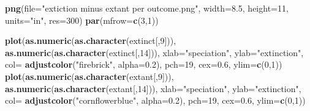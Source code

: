 \documentclass[]{book}
\newenvironment{Shaded}{\begin{snugshade}}{\end{snugshade}}
\newcommand{\KeywordTok}[1]{\textcolor[rgb]{0.13,0.29,0.53}{\textbf{{#1}}}}
\newcommand{\DataTypeTok}[1]{\textcolor[rgb]{0.13,0.29,0.53}{{#1}}}
\newcommand{\DecValTok}[1]{\textcolor[rgb]{0.00,0.00,0.81}{{#1}}}
\newcommand{\FloatTok}[1]{\textcolor[rgb]{0.00,0.00,0.81}{{#1}}}
\newcommand{\StringTok}[1]{\textcolor[rgb]{0.31,0.60,0.02}{{#1}}}
\newcommand{\NormalTok}[1]{{#1}}
\theoremstyle{definition}
\theoremstyle{definition}
\theoremstyle{remark}
\begin{document}
\begin{Shaded}
\begin{Highlighting}[]
\KeywordTok{png}\NormalTok{(}\DataTypeTok{file=}\StringTok{"extiction minus extant per outcome.png"}\NormalTok{, }\DataTypeTok{width=}\FloatTok{8.5}\NormalTok{, }\DataTypeTok{height=}\DecValTok{11}\NormalTok{, }\DataTypeTok{units=}\StringTok{"in"}\NormalTok{, }\DataTypeTok{res=}\DecValTok{300}\NormalTok{)}
\KeywordTok{par}\NormalTok{(}\DataTypeTok{mfrow=}\KeywordTok{c}\NormalTok{(}\DecValTok{3}\NormalTok{,}\DecValTok{1}\NormalTok{))}

\KeywordTok{plot}\NormalTok{(}\KeywordTok{as.numeric}\NormalTok{(}\KeywordTok{as.character}\NormalTok{(extinct[,}\DecValTok{9}\NormalTok{])), }\KeywordTok{as.numeric}\NormalTok{(}\KeywordTok{as.character}\NormalTok{(extinct[,}\DecValTok{14}\NormalTok{])), }\DataTypeTok{xlab=}\StringTok{"speciation"}\NormalTok{, }\DataTypeTok{ylab=}\StringTok{"extinction"}\NormalTok{, }\DataTypeTok{col=} \KeywordTok{adjustcolor}\NormalTok{(}\StringTok{"firebrick"}\NormalTok{, }\DataTypeTok{alpha=}\FloatTok{0.2}\NormalTok{), }\DataTypeTok{pch=}\DecValTok{19}\NormalTok{, }\DataTypeTok{cex=}\FloatTok{0.6}\NormalTok{, }\DataTypeTok{ylim=}\KeywordTok{c}\NormalTok{(}\DecValTok{0}\NormalTok{,}\DecValTok{1}\NormalTok{))}
\KeywordTok{plot}\NormalTok{(}\KeywordTok{as.numeric}\NormalTok{(}\KeywordTok{as.character}\NormalTok{(extant[,}\DecValTok{9}\NormalTok{])), }\KeywordTok{as.numeric}\NormalTok{(}\KeywordTok{as.character}\NormalTok{(extant[,}\DecValTok{14}\NormalTok{])), }\DataTypeTok{xlab=}\StringTok{"speciation"}\NormalTok{, }\DataTypeTok{ylab=}\StringTok{"extinction"}\NormalTok{, }\DataTypeTok{col=} \KeywordTok{adjustcolor}\NormalTok{(}\StringTok{"cornflowerblue"}\NormalTok{, }\DataTypeTok{alpha=}\FloatTok{0.2}\NormalTok{), }\DataTypeTok{pch=}\DecValTok{19}\NormalTok{, }\DataTypeTok{cex=}\FloatTok{0.6}\NormalTok{, }\DataTypeTok{ylim=}\KeywordTok{c}\NormalTok{(}\DecValTok{0}\NormalTok{,}\DecValTok{1}\NormalTok{))}


\end{Highlighting}
\end{Shaded}
\end{document}
